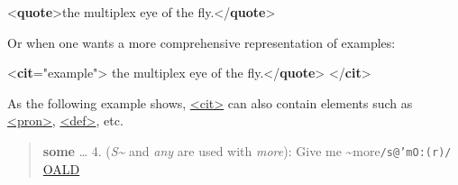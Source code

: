   \par\bgroup{}\exampleFont \begin{shaded}\noindent\mbox{}{<\textbf{quote}>}the multiplex eye of the fly.{</\textbf{quote}>}\end{shaded}\egroup\par \noindent  Or when one wants a more comprehensive representation of examples:\par\bgroup{}\exampleFont \begin{shaded}\noindent\mbox{}{<\textbf{cit}\hspace*{1em}{type}="{example}">}\mbox{}\newline 
{}the multiplex eye of the fly.{</\textbf{quote}>}\mbox{}\newline 
{</\textbf{cit}>}\end{shaded}\egroup\par \noindent  As the following example shows, \hyperref[TEI.cit]{<cit>} can also contain elements such as \hyperref[TEI.pron]{<pron>}, \hyperref[TEI.def]{<def>}, etc.
\begin{quote}{\bfseries some} … 4. ({\itshape S\textasciitilde } and {\itshape any} are used with {\itshape more}): Give me \textasciitilde  more\texttt{/s@'mO:(r)/} \hyperref[DIC-OALD]{OALD}\end{quote}
